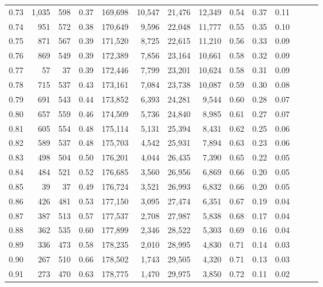 \begin{tabular}{rrrrrrrrrrrrrr}
0.73 &  1,035 &    598 &  0.37 &  169,698 &   10,547 &  21,476 &  12,349 &  0.54 &  0.37 &      0.11 \\
0.74 &    951 &    572 &  0.38 &  170,649 &    9,596 &  22,048 &  11,777 &  0.55 &  0.35 &      0.10 \\
0.75 &    871 &    567 &  0.39 &  171,520 &    8,725 &  22,615 &  11,210 &  0.56 &  0.33 &      0.09 \\
0.76 &    869 &    549 &  0.39 &  172,389 &    7,856 &  23,164 &  10,661 &  0.58 &  0.32 &      0.09 \\
0.77 &     57 &     37 &  0.39 &  172,446 &    7,799 &  23,201 &  10,624 &  0.58 &  0.31 &      0.09 \\
0.78 &    715 &    537 &  0.43 &  173,161 &    7,084 &  23,738 &  10,087 &  0.59 &  0.30 &      0.08 \\
0.79 &    691 &    543 &  0.44 &  173,852 &    6,393 &  24,281 &   9,544 &  0.60 &  0.28 &      0.07 \\
0.80 &    657 &    559 &  0.46 &  174,509 &    5,736 &  24,840 &   8,985 &  0.61 &  0.27 &      0.07 \\
0.81 &    605 &    554 &  0.48 &  175,114 &    5,131 &  25,394 &   8,431 &  0.62 &  0.25 &      0.06 \\
0.82 &    589 &    537 &  0.48 &  175,703 &    4,542 &  25,931 &   7,894 &  0.63 &  0.23 &      0.06 \\
0.83 &    498 &    504 &  0.50 &  176,201 &    4,044 &  26,435 &   7,390 &  0.65 &  0.22 &      0.05 \\
0.84 &    484 &    521 &  0.52 &  176,685 &    3,560 &  26,956 &   6,869 &  0.66 &  0.20 &      0.05 \\
0.85 &     39 &     37 &  0.49 &  176,724 &    3,521 &  26,993 &   6,832 &  0.66 &  0.20 &      0.05 \\
0.86 &    426 &    481 &  0.53 &  177,150 &    3,095 &  27,474 &   6,351 &  0.67 &  0.19 &      0.04 \\
0.87 &    387 &    513 &  0.57 &  177,537 &    2,708 &  27,987 &   5,838 &  0.68 &  0.17 &      0.04 \\
0.88 &    362 &    535 &  0.60 &  177,899 &    2,346 &  28,522 &   5,303 &  0.69 &  0.16 &      0.04 \\
0.89 &    336 &    473 &  0.58 &  178,235 &    2,010 &  28,995 &   4,830 &  0.71 &  0.14 &      0.03 \\
0.90 &    267 &    510 &  0.66 &  178,502 &    1,743 &  29,505 &   4,320 &  0.71 &  0.13 &      0.03 \\
0.91 &    273 &    470 &  0.63 &  178,775 &    1,470 &  29,975 &   3,850 &  0.72 &  0.11 &      0.02 \\

\end{tabular}
